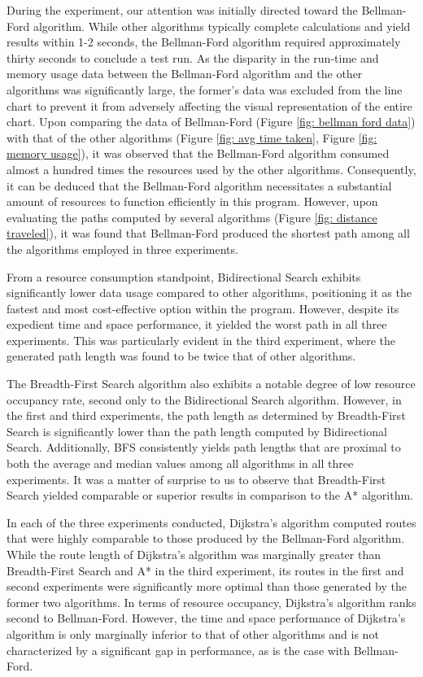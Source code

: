 \documentclass[12pt]{article}
\begin{document}
During the experiment, our attention was initially directed toward the Bellman-Ford algorithm. While other algorithms typically complete calculations and yield results within 1-2 seconds, the Bellman-Ford algorithm required approximately thirty seconds to conclude a test run. As the disparity in the run-time and memory usage data between the Bellman-Ford algorithm and the other algorithms was significantly large, the former's data was excluded from the line chart to prevent it from adversely affecting the visual representation of the entire chart. Upon comparing the data of Bellman-Ford (Figure \ref{fig: bellman ford data}) with that of the other algorithms (Figure \ref{fig: avg time taken}, Figure \ref{fig: memory usage}), it was observed that the Bellman-Ford algorithm consumed almost a hundred times the resources used by the other algorithms. Consequently, it can be deduced that the Bellman-Ford algorithm necessitates a substantial amount of resources to function efficiently in this program. However, upon evaluating the paths computed by several algorithms (Figure \ref{fig: distance traveled}), it was found that Bellman-Ford produced the shortest path among all the algorithms employed in three experiments.

From a resource consumption standpoint, Bidirectional Search exhibits significantly lower data usage compared to other algorithms, positioning it as the fastest and most cost-effective option within the program. However, despite its expedient time and space performance, it yielded the worst path in all three experiments. This was particularly evident in the third experiment, where the generated path length was found to be twice that of other algorithms.

The Breadth-First Search algorithm also exhibits a notable degree of low resource occupancy rate, second only to the Bidirectional Search algorithm. However, in the first and third experiments, the path length as determined by Breadth-First Search is significantly lower than the path length computed by Bidirectional Search. Additionally, BFS consistently yields path lengths that are proximal to both the average and median values among all algorithms in all three experiments. It was a matter of surprise to us to observe that Breadth-First Search yielded comparable or superior results in comparison to the A* algorithm.

In each of the three experiments conducted, Dijkstra's algorithm computed routes that were highly comparable to those produced by the Bellman-Ford algorithm. While the route length of Dijkstra's algorithm was marginally greater than Breadth-First Search and A* in the third experiment, its routes in the first and second experiments were significantly more optimal than those generated by the former two algorithms. In terms of resource occupancy, Dijkstra's algorithm ranks second to Bellman-Ford. However, the time and space performance of Dijkstra's algorithm is only marginally inferior to that of other algorithms and is not characterized by a significant gap in performance, as is the case with Bellman-Ford.
\end{document}

